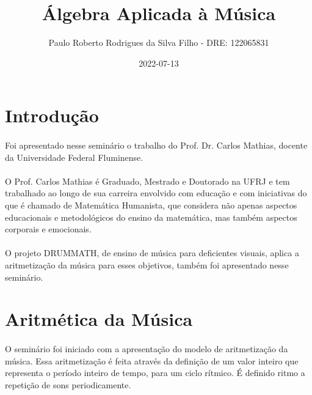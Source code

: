 \documentclass{article}
\title{Álgebra Aplicada à Música}
\date{2022-07-13}
\author{Paulo Roberto Rodrigues da Silva Filho - DRE: 122065831}
\begin{document}
	\renewcommand{\figurename}{Figura}
	\graphicspath{ {./imagens/} }
	\maketitle
	\tableofcontents
	\section{Introdução}
	
	\paragraph{}
	Foi apresentado nesse seminário o trabalho do Prof. Dr. Carlos Mathias, docente da Universidade Federal Fluminense.
	
	\paragraph{}
	O Prof. Carlos Mathias é Graduado, Mestrado e Doutorado na UFRJ e tem trabalhado ao longo de sua carreira envolvido com educação e com iniciativas do que é chamado de Matemática Humanista, que considera não apenas aspectos educacionais e metodológicos do ensino da matemática, mas também aspectos corporais e emocionais.
	
	\paragraph{}
	O projeto DRUMMATH, de ensino de música para deficientes visuais, aplica a aritmetização da música para esses objetivos, também foi apresentado nesse seminário.
	
	\section{Aritmética da Música}
	
	\paragraph{}
	O seminário foi iniciado com a apresentação do modelo de aritmetização da música. Essa aritmetização é feita através da definição de um valor inteiro que representa o período inteiro de tempo, para um ciclo rítmico. É definido ritmo a repetição de sons periodicamente.
	
\end{document}
